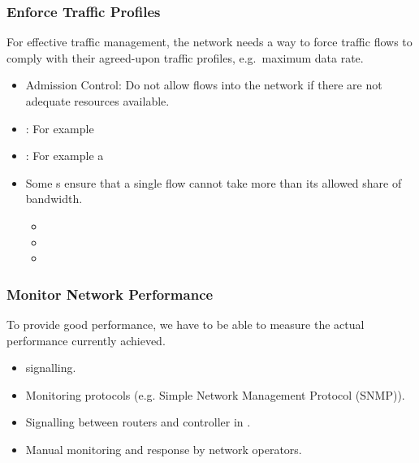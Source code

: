 \subsubsection{Enforce Traffic Profiles}\label{subsubsec:Enforce_Traffic_Profiles}
For effective traffic management, the network needs a way to force traffic flows to comply with their agreed-upon traffic profiles, e.g.\ maximum data rate.
\begin{itemize}[noitemsep]
\item Admission Control: Do not allow flows into the network if there are not adequate resources available.
\item {}: For example 
\item {}: For example a 
\item Some s ensure that a single flow cannot take more than its allowed share of bandwidth.
  \begin{itemize}[noitemsep]
  \item {}
  \item {}
  \item {}
  \end{itemize}
\end{itemize}

\subsubsection{Monitor Network Performance}\label{subsubsec:Monitor_Network_Performance}
To provide good performance, we have to be able to measure the actual performance currently achieved.
\begin{itemize}[noitemsep]
\item {} signalling.
\item Monitoring protocols (e.g. Simple Network Management Protocol (SNMP)).
\item Signalling between routers and controller in .
\item Manual monitoring and response by network operators.
\end{itemize}






